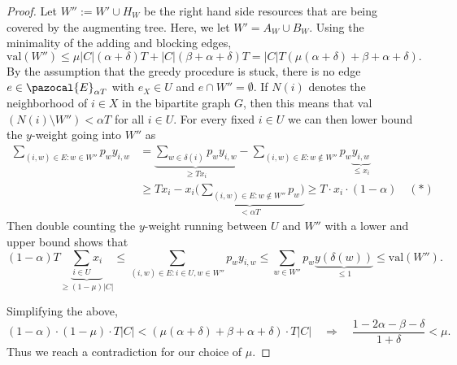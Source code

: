 \begin{proof}
Let $W'' := W' \cup H_W$ be the right hand side resources
that are being covered by the augmenting tree. 
Here, we let $W' = A_W \cup B_W$.
Using the minimality of the adding and blocking edges,
\[
    \text{val}(W'') \leq \mu |C|(\alpha + \delta) T + |C| (\beta + \alpha + \delta)T = 
    |C|T (\mu (\alpha + \delta) + \beta + \alpha + \delta).   \]
By the assumption that the greedy procedure is stuck, there is no edge $e \in \pazocal{E}_{\alpha T}$
with $e_X \in U$ and $e \cap W'' = \emptyset$. If $N(i)$ denotes the neighborhood of $i \in X$ in the bipartite
graph $G$, then this means that val$(N(i) \setminus W'') < \alpha T$ for all $i \in U$.
For every fixed $i \in U$ we can then lower bound the $y$-weight going into $W''$ as 
\begin{align*}
  \sum_{(i,w) \in E: w \in W''}{p_w} y_{i,w} &= \underbrace{\sum_{w \in \delta(i)} {p_w}y_{i,w}}_{\geq T x_i} - \sum_{(i,w) \in E: w \notin W''} {p_w}\underbrace{y_{i,w}}_{\leq x_i}\\
  &\geq T {x_i} -{x_i} \underbrace{\Big(\sum_{(i,w) \in E: w \notin W''} {p_w} \Big)}_{<\alpha T}\geq T \cdot x_i \cdot (1-\alpha) \quad (*)
\end{align*}
Then double counting the $y$-weight running between $U$ and $W''$ with a lower and upper bound shows that
\[
 (1-\alpha) T \underbrace{\sum_{i \in U} x_i}_{\geq (1-\mu) |C|} {\leq}
\sum_{(i,w) \in E: i \in U,w \in W''}{p_w} y_{i,w} \leq \sum_{w \in W''} {p_w}\underbrace{y(\delta(w))}_{\leq 1} \leq  \text{val}(W'').
\]

Simplifying the above,
\[
    (1-\alpha) \cdot (1-\mu) \cdot T |C| < (\mu (\alpha + \delta) + \beta + \alpha + \delta) \cdot  T |C| 
    \quad \Rightarrow \quad \frac{1-2\alpha  -\beta - \delta}{1+\delta} < \mu. %
\]
Thus we reach a contradiction for our choice of $\mu$.
\end{proof}

